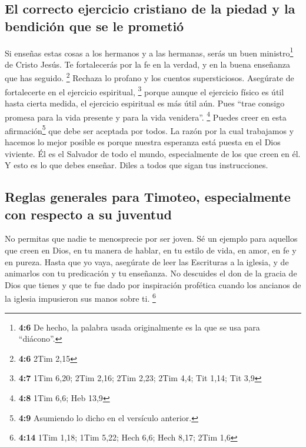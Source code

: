 \hypertarget{el-correcto-ejercicio-cristiano-de-la-piedad-y-la-bendiciuxf3n-que-se-le-prometiuxf3}{%
\subsection{El correcto ejercicio cristiano de la piedad y la bendición
que se le
prometió}\label{el-correcto-ejercicio-cristiano-de-la-piedad-y-la-bendiciuxf3n-que-se-le-prometiuxf3}}

 Si enseñas estas cosas a los hermanos y a las hermanas,
serás un buen ministro\footnote{\textbf{4:6} De hecho, la palabra usada
  originalmente es la que se usa para ``diácono''.} de Cristo Jesús. Te
fortalecerás por la fe en la verdad, y en la buena enseñanza que has
seguido. \footnote{\textbf{4:6} 2Tim 2,15}  Rechaza lo
profano y los cuentos supersticiosos. Asegúrate de fortalecerte en el
ejercicio espiritual, \footnote{\textbf{4:7} 1Tim 6,20; 2Tim 2,16; 2Tim
  2,23; 2Tim 4,4; Tit 1,14; Tit 3,9}  porque aunque el
ejercicio físico es útil hasta cierta medida, el ejercicio espiritual es
más útil aún. Pues ``trae consigo promesa para la vida presente y para
la vida venidera''. \footnote{\textbf{4:8} 1Tim 6,6; Heb 13,9}
 Puedes creer en esta afirmación\footnote{\textbf{4:9}
  Asumiendo lo dicho en el versículo anterior.} que debe ser aceptada
por todos.  La razón por la cual trabajamos y hacemos lo
mejor posible es porque nuestra esperanza está puesta en el Dios
viviente. Él es el Salvador de todo el mundo, especialmente de los que
creen en él.  Y esto es lo que debes enseñar. Diles a
todos que sigan tus instrucciones.

\hypertarget{reglas-generales-para-timoteo-especialmente-con-respecto-a-su-juventud}{%
\subsection{Reglas generales para Timoteo, especialmente con respecto a
su
juventud}\label{reglas-generales-para-timoteo-especialmente-con-respecto-a-su-juventud}}

 No permitas que nadie te menosprecie por ser joven. Sé
un ejemplo para aquellos que creen en Dios, en tu manera de hablar, en
tu estilo de vida, en amor, en fe y en pureza.  Hasta que
yo vaya, asegúrate de leer las Escrituras a la iglesia, y de animarlos
con tu predicación y tu enseñanza.  No descuides el don
de la gracia de Dios que tienes y que te fue dado por inspiración
profética cuando los ancianos de la iglesia impusieron sus manos sobre
ti. \footnote{\textbf{4:14} 1Tim 1,18; 1Tim 5,22; Hech 6,6; Hech 8,17;
  2Tim 1,6}


